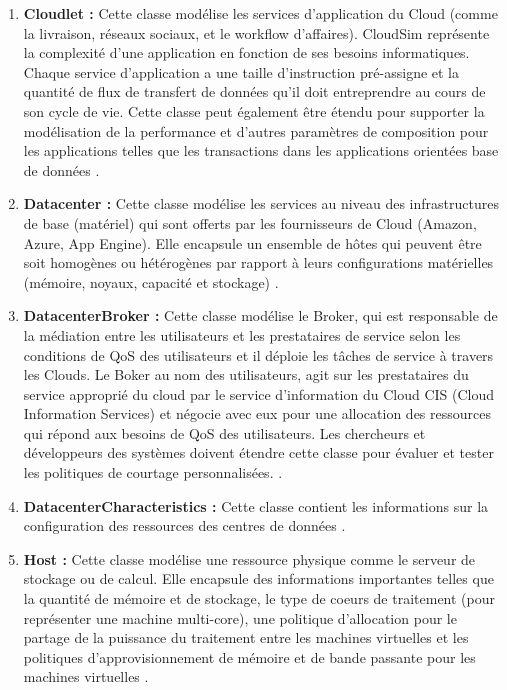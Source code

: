 \begin{onehalfspace}
\begin{enumerate} [label=\Alph*.      ]
\item \textbf{Cloudlet :} Cette classe modélise les services d'application du Cloud (comme la livraison, réseaux
sociaux, et le workflow d'affaires). CloudSim représente la complexité d'une application en fonction de ses besoins informatiques. Chaque service d'application a une taille d'instruction pré-assigne et la quantité de flux de transfert de données qu'il doit entreprendre au cours de son cycle de vie. Cette classe peut également être étendu pour supporter la modélisation de la performance et d’autres paramètres de composition pour les applications telles que les transactions dans les applications orientées base de données \cite{ref45}.
\item \textbf{Datacenter :} Cette classe modélise les services au niveau des infrastructures de base (matériel) qui sont offerts par les fournisseurs de Cloud (Amazon, Azure, App Engine). Elle encapsule un ensemble de hôtes qui peuvent être soit homogènes ou hétérogènes par rapport à leurs configurations matérielles (mémoire, noyaux, capacité et stockage) \cite{ref45}.
\item \textbf{DatacenterBroker :} Cette classe modélise le Broker, qui est responsable de la médiation entre les utilisateurs et les prestataires de service selon les conditions de QoS des utilisateurs et il déploie les tâches de service à travers les Clouds. Le Boker au nom des utilisateurs, agit sur les prestataires du service approprié du cloud par le service d’information du Cloud CIS (Cloud Information Services) et négocie avec eux pour une allocation des ressources qui répond aux besoins de QoS des utilisateurs. Les chercheurs et développeurs des systèmes doivent étendre cette classe pour évaluer et tester les politiques de courtage personnalisées. \cite{ref45}.
\item \textbf{DatacenterCharacteristics :} Cette classe contient les informations sur la configuration des ressources des centres de données \cite{ref45}. 
\item \textbf{Host :} Cette classe modélise une ressource physique comme le serveur de stockage ou de calcul. Elle encapsule des informations importantes telles que la quantité de mémoire et de stockage, le type de coeurs de traitement (pour représenter une machine multi-core), une politique d’allocation pour le partage de la puissance du traitement entre les machines virtuelles et les politiques d’approvisionnement de mémoire et de bande passante pour les machines virtuelles \cite{ref45}.

\end{enumerate}
\end{onehalfspace}

